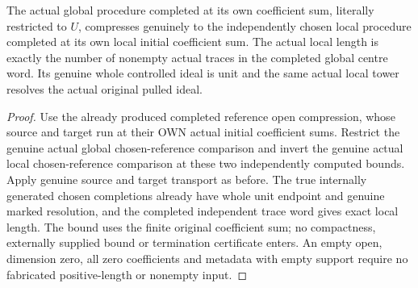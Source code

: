\begin{theorem}
\label{hir:nc-ordered-choice-open-independent-own-completion}
\leanok
{}
The actual global procedure completed at its own coefficient sum, literally restricted to $U$, compresses genuinely to the independently chosen local procedure completed at its own local initial coefficient sum. The actual local length is exactly the number of nonempty actual traces in the completed global centre word. Its genuine whole controlled ideal is unit and the same actual local tower resolves the actual original pulled ideal.
\end{theorem}
\begin{proof}
Use the already produced completed reference open compression, whose source and target run at their OWN actual initial coefficient sums. Restrict the genuine actual global chosen-reference comparison and invert the genuine actual local chosen-reference comparison at these two independently computed bounds. Apply genuine source and target transport as before. The true internally generated chosen completions already have whole unit endpoint and genuine marked resolution, and the completed independent trace word gives exact local length. The bound uses the finite original coefficient sum; no compactness, externally supplied bound or termination certificate enters. An empty open, dimension zero, all zero coefficients and metadata with empty support require no fabricated positive-length or nonempty input.
\end{proof}

